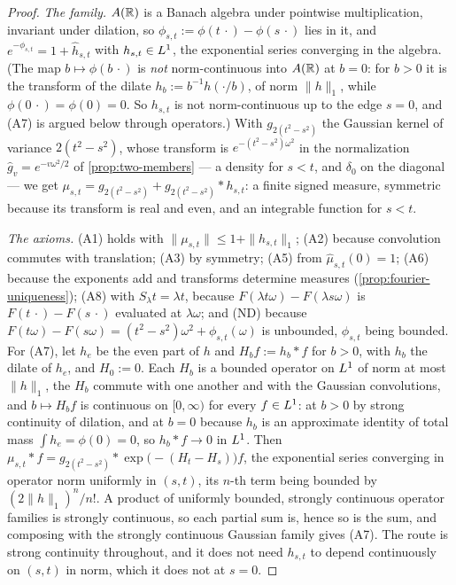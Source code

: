 \begin{proof}
\emph{The family.} $A(\mathbb{R})$ is a Banach algebra under pointwise multiplication, invariant
under dilation, so $\phi_{s,t} := \phi(t\,\cdot) - \phi(s\,\cdot)$ lies in it, and
$e^{-\phi_{s,t}} = 1 + \hat h_{s,t}$ with $h_{s,t} \in L^1$, the exponential series converging
in the algebra. (The map $b \mapsto \phi(b\,\cdot)$ is \emph{not} norm-continuous into $A(\mathbb{R})$
at $b = 0$: for $b > 0$ it is the transform of the dilate $h_b := b^{-1}h(\cdot/b)$, of norm
$\|h\|_1$, while $\phi(0\,\cdot) = \phi(0) = 0$. So $h_{s,t}$ is not norm-continuous up to the
edge $s = 0$, and (A7) is argued below through operators.) With $g_{2(t^2-s^2)}$ the
Gaussian kernel of variance $2(t^2-s^2)$, whose transform is $e^{-(t^2-s^2)\omega^2}$ in the
normalization $\hat g_v = e^{-v\omega^2/2}$ of \ref{prop:two-members} --- a density for
$s < t$, and $\delta_0$ on the diagonal
--- we get $\mu_{s,t} = g_{2(t^2-s^2)} + g_{2(t^2-s^2)} * h_{s,t}$: a finite signed measure,
symmetric because its transform is real and even, and an integrable function for $s < t$.

\emph{The axioms.} (A1) holds with $\|\mu_{s,t}\| \le 1 + \|h_{s,t}\|_1$; (A2) because
convolution commutes with translation; (A3) by symmetry; (A5) from $\hat\mu_{s,t}(0) = 1$; (A6)
because the exponents add and transforms determine measures (\ref{prop:fourier-uniqueness});
(A8) with $S_\lambda t = \lambda t$, because $F(\lambda t\omega) - F(\lambda s\omega)$ is
$F(t\,\cdot) - F(s\,\cdot)$ evaluated at $\lambda\omega$; and (ND) because
$F(t\omega) - F(s\omega) = (t^2-s^2)\omega^2 + \phi_{s,t}(\omega)$ is unbounded, $\phi_{s,t}$
being bounded. For (A7), let $h_e$ be the even part of $h$ and $H_b f := h_b * f$ for
$b > 0$, with $h_b$ the dilate of $h_e$, and $H_0 := 0$. Each $H_b$ is a bounded operator on
$L^1$ of norm at most $\|h\|_1$, the $H_b$ commute with one another and with the Gaussian
convolutions, and $b \mapsto H_b f$ is continuous on $[0,\infty)$ for every $f \in L^1$: at
$b > 0$ by strong continuity of dilation, and at $b = 0$ because $h_b$ is an approximate
identity of total mass $\int h_e = \phi(0) = 0$, so $h_b * f \to 0$ in $L^1$. Then
$\mu_{s,t} * f = g_{2(t^2-s^2)} * \exp\bigl(-(H_t - H_s)\bigr)f$, the exponential series converging in
operator norm uniformly in $(s,t)$, its $n$-th term being bounded by $(2\|h\|_1)^n/n!$. A product
of uniformly bounded, strongly continuous operator families is strongly continuous, so each
partial sum is, hence so is the sum, and composing with the strongly continuous Gaussian family
gives (A7). The route is strong continuity throughout, and it does not need $h_{s,t}$ to depend
continuously on $(s,t)$ in norm, which it does not at $s = 0$.


\end{proof}
